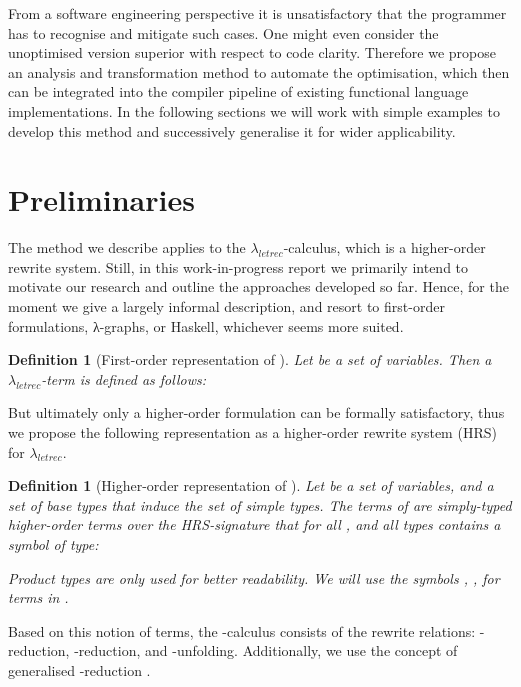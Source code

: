 \documentclass[submission,copyright,creativecommons]{eptcs}
\newtheorem{definition}[theorem]{Definition}
\newcommand{\lambdaletrec}{\ensuremath{\lambda_\textit{letrec}}}
\newcommand{\nbd}{\nobreakdash}
\renewcommand\;{\,}
\begin{document}
From a software engineering perspective it is unsatisfactory that the
programmer has to recognise and mitigate such cases. One might even consider
the unoptimised version superior with respect to code
clarity. Therefore we propose an analysis and transformation method to automate
the optimisation, which then can be integrated into the compiler pipeline of
existing functional language implementations.
In the following sections we will work with simple examples to develop this
method and successively generalise it for wider applicability.






\section{Preliminaries}\label{sec:prelims}


The method we describe applies to the \lambdaletrec-calculus, which is a
higher-order rewrite system. Still, in this work-in-progress report we
primarily intend to motivate our research and outline the approaches developed
so far. Hence, for the moment we give a largely informal description, and
resort to first-order formulations, λ-graphs, or Haskell, whichever seems more suited.

\begin{definition}[First-order representation of ]\normalfont Let  be a set of variables. Then a \lambdaletrec-term is defined as follows:

\end{definition}


But ultimately only a higher-order formulation can be formally
satisfactory, thus we propose the following representation as a higher-order
rewrite system (HRS) \cite{terese:2003} for \lambdaletrec.

\begin{definition}[Higher-order representation of ]\normalfont
  \label{def:lambdaletrec:terms}
Let  be a set of variables, and  a set of base types that induce the set  of simple types.
  The \emph{terms} of  are simply-typed higher-order terms over the HRS\nbd-signature
  that for all , and all types  contains a symbol  of type:

Product types are only used for better readability.
We will use the symbols , ,  for terms in . 
\end{definition}  
  
Based on this notion of terms, the \nbd-calculus 
consists of the rewrite relations: -reduction, \nbd-reduction, and \nbd-unfolding.
Additionally, we use the concept of generalised \nbd-reduction \cite{kama:nede:1995}.
\end{document}
